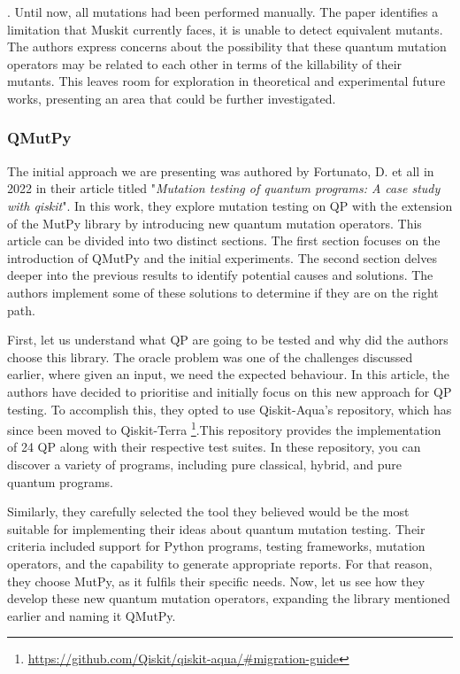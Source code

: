 \begin{itemize}
. Until now, all mutations had been performed manually. The paper identifies a limitation that Muskit currently faces, it is unable to detect equivalent mutants. The authors express concerns about the possibility that these quantum mutation operators may be related to each other in terms of the killability of their mutants. This leaves room for exploration in theoretical and experimental future works, presenting an area that could be further investigated.


\vspace{15pt}
\subsubsection{QMutPy}
\label{Ch2.3.2:QMutPy}
The initial approach we are presenting was authored by Fortunato, D. et all in 2022 in their article titled "\textit{Mutation testing of quantum programs: A case study with qiskit}"\cite{fortunato2022mutation}. In this work, they explore mutation testing on QP with the extension of the MutPy library by introducing new quantum mutation operators. This article can be divided into two distinct sections. The first section focuses on the introduction of QMutPy and the initial experiments. The second section delves deeper into the previous results to identify potential causes and solutions. The authors implement some of these solutions to determine if they are on the right path. \newline

First, let us understand what QP are going to be tested and why did the authors choose this library. The oracle problem was one of the challenges discussed earlier, where given an input, we need the expected behaviour. In this article, the authors have decided to prioritise and initially focus on this new approach for QP testing. To accomplish this, they opted to use Qiskit-Aqua's repository, which has since been moved to Qiskit-Terra \footnote{\url{https://github.com/Qiskit/qiskit-aqua/\#migration-guide}}.This repository provides the implementation of 24 QP along with their respective test suites. In these repository, you can discover a variety of programs, including pure classical, hybrid, and pure quantum programs.\newline

Similarly, they carefully selected the tool they believed would be the most suitable for implementing their ideas about quantum mutation testing. Their criteria included support for Python programs, testing frameworks, mutation operators, and the capability to generate appropriate reports. For that reason, they choose MutPy, as it fulfils their specific needs. Now, let us see how they develop these new quantum mutation operators, expanding the library mentioned earlier and naming it QMutPy.\newline


\end{itemize}
